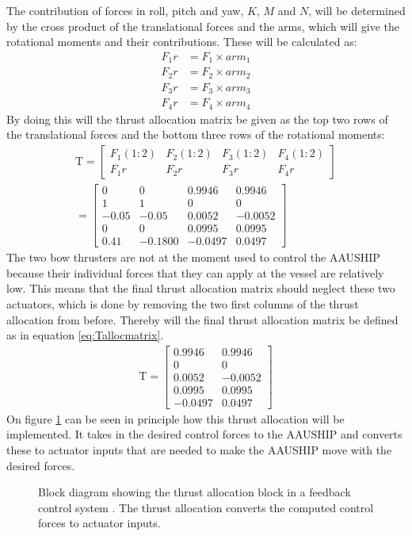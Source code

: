 The contribution of forces in roll, pitch and yaw, $K$, $M$ and $N$, will be determined by the cross product of the translational forces and the arms, which will give the rotational moments and their contributions. These will be calculated as:
\begin{align}
F_1r &= F_1\times arm_1\\
F_2r &= F_2\times arm_2\\
F_3r &= F_3\times arm_3\\
F_4r &= F_4\times arm_4
\end{align}
By doing this will the thrust allocation matrix be given as the top two rows of the translational forces and the bottom three rows of the rotational moments:
\begin{align}
\text{T} =
\begin{bmatrix}
F_1(1:2) & F_2(1:2) & F_3(1:2) & F_4(1:2) \\
F_1r & F_2r & F_3r & F_4r
\end{bmatrix}\\
=
\begin{bmatrix}
0 & 0 & 0.9946 & 0.9946 \\
1 & 1 & 0 & 0 \\
-0.05 & -0.05 & 0.0052 & -0.0052 \\
0 & 0 & 0.0995 & 0.0995 \\
0.41 & -0.1800 & -0.0497 & 0.0497
\end{bmatrix}
\end{align}
The two bow thrusters are not at the moment used to control the AAUSHIP because their individual forces that they can apply at the vessel are relatively low. This means that the final thrust allocation matrix should neglect these two actuators, which is done by removing the two first columns of the thrust allocation from before. Thereby will the final thrust allocation matrix be defined as in equation \ref{eq:Tallocmatrix}.
\begin{align}
\text{T} =
\begin{bmatrix}
0.9946 & 0.9946 \\
0 & 0 \\
0.0052 & -0.0052 \\
0.0995 & 0.0995 \\
-0.0497 & 0.0497
\end{bmatrix}
\label{eq:Tallocmatrix}
\end{align}
On figure \ref{fig:thrust_allocation_block} can be seen in principle how this thrust allocation will be implemented. It takes in the desired control forces to the AAUSHIP and converts these to actuator inputs that are needed to make the AAUSHIP move with the desired forces.
\begin{figure}[htbp]
\centering

\caption{Block diagram showing the thrust allocation block in a
feedback control system \citep[fig.12.25]{fossen}. The thrust
allocation converts the computed control forces to actuator inputs.}
\label{fig:thrust_allocation_block}
\end{figure}